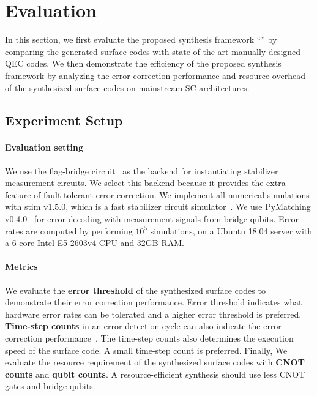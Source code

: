 \section{Evaluation}
\label{sect:evaluation}

In this section, we first evaluate the proposed synthesis framework ``\myCompilerName'' by comparing the generated surface codes with state-of-the-art manually designed QEC codes. 
We then demonstrate the efficiency of the proposed synthesis framework  by analyzing the error correction performance and resource overhead of the synthesized surface codes on mainstream SC architectures.

\subsection{Experiment Setup}

\paragraph{Evaluation setting}
We use the flag-bridge circuit~\cite{Lao2020FaulttolerantQE} as the backend for instantiating stabilizer measurement circuits. We select this backend because it provides the extra feature of fault-tolerant error correction.
We implement all numerical simulations with stim v1.5.0, which is a fast stabilizer circuit simulator~\cite{gidney2021stim}. We use PyMatching v0.4.0~\cite{higgott2021pymatching} for error decoding with measurement signals from bridge qubits. Error rates are computed by performing $10^5$ simulations, on a Ubuntu 18.04 server with a 6-core Intel E5-2603v4 CPU and 32GB RAM.



\paragraph{Metrics} We evaluate the \textbf{error threshold} of the synthesized surface codes to demonstrate their error correction performance. Error threshold indicates what hardware error rates can be tolerated and a higher error threshold is preferred. 
\textbf{Time-step counts} in an error detection cycle can also 
indicate the error correction performance~\cite{fowler2012surface}. The time-step counts also determines the execution speed of the surface code. A small time-step count is preferred. 
Finally, 
We evaluate the resource requirement of the synthesized surface codes with \textbf{CNOT counts} and \textbf{qubit counts}. A resource-efficient synthesis should use less CNOT gates and bridge qubits.

